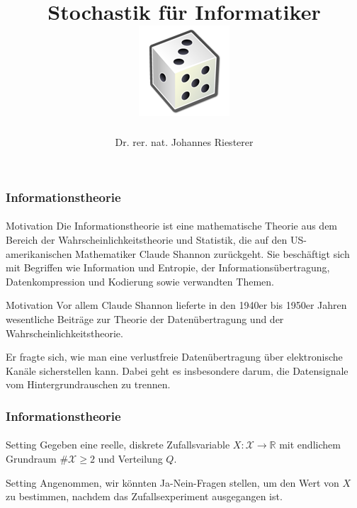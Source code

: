 \documentclass{beamer}
\begin{document}
\title[Stochastik] %
{Stochastik für Informatiker
\\
\includegraphics[scale=0.5]{img/craps}
}
\subtitle{}
\author[Dr. Johannes Riesterer] %
{Dr.  rer. nat. Johannes Riesterer}

\date[KPT 2004] %
{}

\subject{Stochastik}


\frame{\titlepage}
\begin{frame}
    \frametitle{Informationstheorie}
\framesubtitle{}
\begin{block}{Motivation}
Die Informationstheorie ist eine mathematische Theorie aus dem Bereich der Wahrscheinlichkeitstheorie und Statistik, die auf den US-amerikanischen Mathematiker Claude Shannon zurückgeht. Sie beschäftigt sich mit Begriffen wie Information und Entropie, der Informationsübertragung, Datenkompression und Kodierung sowie verwandten Themen. 
\end{block}


\begin{block}{Motivation}
Vor allem Claude Shannon lieferte in den 1940er bis 1950er Jahren wesentliche Beiträge zur Theorie der Datenübertragung und der Wahrscheinlichkeitstheorie.

Er fragte sich, wie man eine verlustfreie Datenübertragung über elektronische Kanäle sicherstellen kann. Dabei geht es insbesondere darum, die Datensignale vom Hintergrundrauschen zu trennen. 
\end{block}

 \end{frame}




\begin{frame}
    \frametitle{Informationstheorie}
\framesubtitle{}
\begin{block}{Setting}
Gegeben eine reelle, diskrete Zufallsvariable $X :\mathcal{X} \to \mathbb{R}$ mit endlichem Grundraum $\#\mathcal{X}  \geq 2$ und Verteilung $Q$.
\end{block}

\begin{block}{Setting}
Angenommen, wir könnten Ja-Nein-Fragen stellen, um den Wert von $X$ zu bestimmen, nachdem das Zufallsexperiment ausgegangen ist.

\end{block}

 \end{frame}
\end{document}
